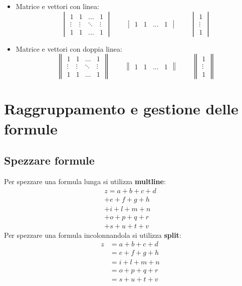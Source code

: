 \documentclass[a4paper,12pt,oneside]{book}
\theoremstyle{plain}
\begin{document}
\begin{itemize}
		\item Matrice e vettori con linea:
		\[
		\begin{vmatrix}
			1 & 1 & \dots & 1\\
			\vdots & \vdots & \ddots & \vdots\\
			1 & 1 & \dots & 1
		\end{vmatrix} \qquad \begin{vmatrix}
			1 & 1 & \dots & 1
		\end{vmatrix} \qquad \begin{vmatrix}
			1\\
			\vdots\\
			1
		\end{vmatrix}
		\]
		
		\item Matrice e vettori con doppia linea:
		\[
		\begin{Vmatrix}
			1 & 1 & \dots & 1\\
			\vdots & \vdots & \ddots & \vdots\\
			1 & 1 & \dots & 1
		\end{Vmatrix} \qquad \begin{Vmatrix}
			1 & 1 & \dots & 1
		\end{Vmatrix} \qquad \begin{Vmatrix}
			1\\
			\vdots\\
			1
		\end{Vmatrix}
		\]
	\end{itemize}


	\section{Raggruppamento e gestione delle formule}
	\subsection{Spezzare formule}
	Per spezzare una formula lunga si utilizza \textbf{multline}:
	\begin{multline}
		z = a + b + c + d\\
		+ e + f + g + h\\
		+ i + l + m + n\\
		+ o + p + q + r\\
		+ s + u + t + v
	\end{multline}
	Per spezzare una formula incolonnandola si utilizza \textbf{split}:
	\[
	\begin{split}
		z &= a + b + c + d\\
		&= e + f + g + h\\
		&= i + l + m + n\\
		&= o + p + q + r\\
		&= s + u + t + v
	\end{split}
	\]
	
\end{document}
